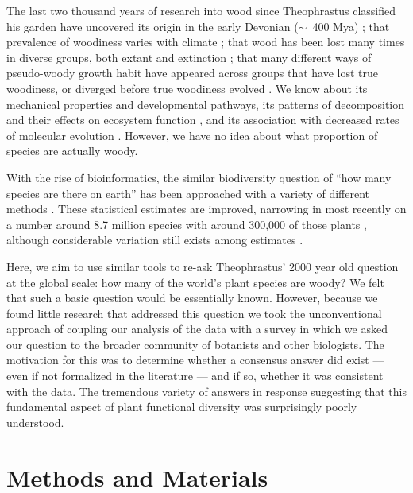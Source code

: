 \documentclass[12pt]{article}
\begin{document}
The last two thousand years of research into wood since Theophrastus
classified his garden have uncovered its origin in the early Devonian
($\sim$~400 Mya) \citep{gerrienne2011simple}; that prevalence of
woodiness varies with climate \citep{Molesheihgt}; that wood has been
lost many times in diverse groups, both extant and extinction
\citep{judd1994}; that many different ways of pseudo-woody growth
habit have appeared across groups that have lost true woodiness, or
diverged before true woodiness evolved \citep{Cornwellwood}.  We know
about its mechanical properties and developmental pathways, its
patterns of decomposition and their effects on ecosystem function
\citep{Cornwellwood}, and its association with decreased rates of
molecular evolution \citep{SmithDonoghue}.
However, we have no idea about what proportion of species are
actually woody.

With the rise of bioinformatics, the similar biodiversity question of
``how many species are there on earth'' has been approached with a
variety of different methods \citep{may1988many,erwin1991many,
  stork1993many, joppa2010, costello2011, mora2011plos}.  These
statistical estimates are improved, narrowing in most recently on a
number around 8.7 million species with around 300,000 of those plants
\citep{mora2011plos}, although considerable variation still exists
among estimates \citep{costello2011}.

Here, we aim to use similar tools to re-ask Theophrastus' 2000 year
old question at the global scale: how many of the world's plant
species are woody?
%
We felt that such a basic question would be essentially known.
However, because we found little research that addressed this question
we took the unconventional approach of coupling our analysis of the
data with a survey in which we asked our question to the broader
community of botanists and other biologists.  The motivation for this
was to determine whether a consensus answer did exist --- even if not
formalized in the literature --- and if so, whether it was consistent
with the data.
% 
The tremendous variety of answers in response suggesting that this
fundamental aspect of plant functional diversity was surprisingly
poorly understood.

\section{Methods and Materials}
\end{document}
